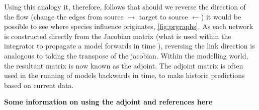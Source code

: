 Using this analogy it, therefore, follows that should we reverse the direction of the flow (change the edges from source $\rightarrow$ target to source $\leftarrow$) it would be possible to see where species influence originates, \autoref{fig:prgraphs}. As each network is constructed directly from the Jacobian matrix (what is used within the integrator to propagate a model forwards in time ), reversing the link direction is analogous to taking the transpose of the jacobian. Within the modelling world, the resultant matrix is now known as the adjoint. The adjoint matrix is often used in the running of models backwards in time, to make historic predictions based on current data. 

\textbf{Some information on using the adjoint and references here }




